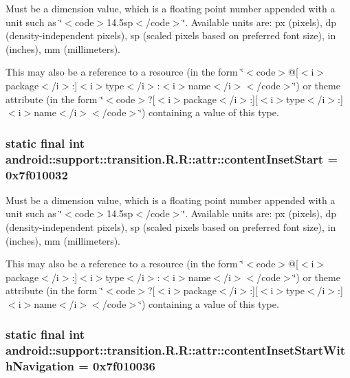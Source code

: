 Must be a dimension value, which is a floating point number appended with a unit such as \char`\"{}$<$code$>$14.5sp$<$/code$>$\char`\"{}. Available units are: px (pixels), dp (density-independent pixels), sp (scaled pixels based on preferred font size), in (inches), mm (millimeters). 

This may also be a reference to a resource (in the form \char`\"{}$<$code$>$@\mbox{[}$<$i$>$package$<$/i$>$:\mbox{]}$<$i$>$type$<$/i$>$:$<$i$>$name$<$/i$>$$<$/code$>$\char`\"{}) or theme attribute (in the form \char`\"{}$<$code$>$?\mbox{[}$<$i$>$package$<$/i$>$:\mbox{]}\mbox{[}$<$i$>$type$<$/i$>$:\mbox{]}$<$i$>$name$<$/i$>$$<$/code$>$\char`\"{}) containing a value of this type. \hypertarget{classandroid_1_1support_1_1transition_1_1_r_1_1attr_5ddab5f82018f6dd36248f0e29049647}{
\subsubsection[{contentInsetStart}]{\setlength{\rightskip}{0pt plus 5cm}static final int android::support::transition.R.R::attr::contentInsetStart = 0x7f010032}}
\label{classandroid_1_1support_1_1transition_1_1_r_1_1attr_5ddab5f82018f6dd36248f0e29049647}


Must be a dimension value, which is a floating point number appended with a unit such as \char`\"{}$<$code$>$14.5sp$<$/code$>$\char`\"{}. Available units are: px (pixels), dp (density-independent pixels), sp (scaled pixels based on preferred font size), in (inches), mm (millimeters). 

This may also be a reference to a resource (in the form \char`\"{}$<$code$>$@\mbox{[}$<$i$>$package$<$/i$>$:\mbox{]}$<$i$>$type$<$/i$>$:$<$i$>$name$<$/i$>$$<$/code$>$\char`\"{}) or theme attribute (in the form \char`\"{}$<$code$>$?\mbox{[}$<$i$>$package$<$/i$>$:\mbox{]}\mbox{[}$<$i$>$type$<$/i$>$:\mbox{]}$<$i$>$name$<$/i$>$$<$/code$>$\char`\"{}) containing a value of this type. \hypertarget{classandroid_1_1support_1_1transition_1_1_r_1_1attr_bb54325dce4a30bc220659bbd0266834}{
\subsubsection[{contentInsetStartWithNavigation}]{\setlength{\rightskip}{0pt plus 5cm}static final int android::support::transition.R.R::attr::contentInsetStartWithNavigation = 0x7f010036}}
\label{classandroid_1_1support_1_1transition_1_1_r_1_1attr_bb54325dce4a30bc220659bbd0266834}


